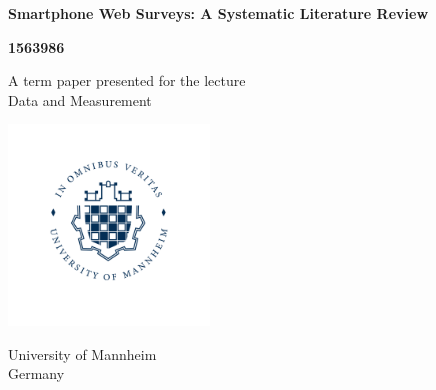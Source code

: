 \documentclass[12pt,a4paper]{article}
\begin{document}
\begin{titlepage}
   \begin{center}
   
       \vspace*{1cm}
       
       \large
       \textbf{Smartphone Web Surveys: A Systematic Literature Review}
        
       \vspace{1.5cm}
   
       \textbf{1563986}
   
       \vfill
   
       A term paper presented for the lecture\\
       Data and Measurement
   
       \vspace{0.8cm}
   
       \includegraphics[width=0.4\textwidth]{reports/figures/08_UM_SIGNET_EN_RGB.png}
       
       University of Mannheim\\
       Germany\\
   
       \date{\today}
   
   \end{center}
\end{titlepage}
\end{document}

